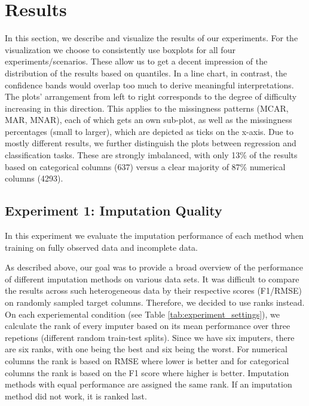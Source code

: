 \section{Results}
\label{sec:results}

In this section, we describe and visualize the results of our experiments. For the visualization we choose to consistently use boxplots for all four experiments/scenarios. These allow us to get a decent impression of the distribution of the results based on quantiles. In a line chart, in contrast, the confidence bands would overlap too much to derive meaningful interpretations. The plots' arrangement from left to right corresponds to the degree of difficulty increasing in this direction. This applies to the missingness patterns (MCAR, MAR, MNAR), each of which gets an own sub-plot, as well as the missingness percentages (small to larger), which are depicted as ticks on the x-axis. Due to mostly different results, we further distinguish the plots between regression and classification tasks. These are strongly imbalanced, with only 13\% of the results based on categorical columns (637) versus a clear majority of 87\% numerical columns (4293).


\subsection{Experiment 1: Imputation Quality}

In this experiment we evaluate the imputation performance of each method when training on fully observed data and incomplete data.

As described above, our goal was to provide a broad overview of the performance of different imputation methods on various data sets. It was difficult to compare the results across such heterogeneous data by their respective scores (F1/RMSE) on randomly sampled target columns. Therefore, we decided to use ranks instead. On each experiemental condition (see Table \ref{tab:experiment_settings}), we calculate the rank of every imputer based on its mean performance over three repetions (different random train-test splits). Since we have six imputers, there are six ranks, with one being the best and six being the worst. For numerical columns the rank is based on RMSE where lower is better and for categorical columns the rank is based on the F1 score where higher is better. Imputation methods with equal performance are assigned the same rank. If an imputation method did not work, it is ranked last.


